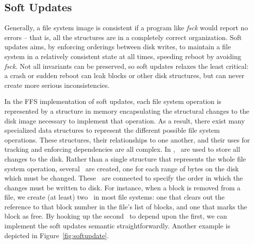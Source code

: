 \subsection {Soft Updates}
\label{sec:consistency:softupdate}

Generally, a file system image is consistent if a program like \emph{fsck}
would report no errors -- that is, all the structures are in a completely
correct organization.  
%
Soft updates aims, by enforcing orderings between disk writes, to maintain
a file system in a relatively consistent state at all times, speeding reboot
by avoiding \emph{fsck}.
%
Not all invariants can be preserved, so soft updates relaxes the least
critical: a crash or sudden reboot can leak blocks or other disk
structures, but can never create more serious inconsistencies.
%
%

In the FFS implementation of soft updates, each file system operation is
represented by a structure in memory encapsulating the structural changes to the
disk image necessary to implement that operation. As a result, there exist many
specialized data structures to represent the different possible file system
operations. These structures, their relationships to one another, and their uses
for tracking and enforcing dependencies are all complex.
%
In \Kudos, \chdescs\ are used to store all changes to the disk. Rather than a
single structure that represents the whole file system operation, several
\chdescs\ are created, one for each range of bytes on the disk which must be
changed. These \chdescs\ are connected to specify the order in which the changes
must be written to disk. For instance, when a block is removed from a file, we
create (at least) two \chdescs\ in most file systems: one that clears out the
reference to that block number in the file's list of blocks, and one that marks
the block as free. By hooking up the second \chdesc\ to depend upon the first,
we can implement the soft updates semantic straightforwardly. Another example is
depicted in Figure~\ref{fig:softupdate}.

